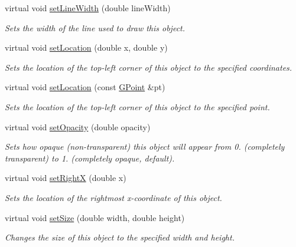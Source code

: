 \begin{DoxyCompactItemize}
virtual void \mbox{\hyperlink{classsgl_1_1GObject_afd6a47c6ea6a1f85ca05a65ba3ff3477}{set\+Line\+Width}} (double line\+Width)
\begin{DoxyCompactList}\small\item\em Sets the width of the line used to draw this object. \end{DoxyCompactList}\item 
virtual void \mbox{\hyperlink{classsgl_1_1GObject_a04594e8ba9b98513a64f1da00dcae18c}{set\+Location}} (double x, double y)
\begin{DoxyCompactList}\small\item\em Sets the location of the top-\/left corner of this object to the specified coordinates. \end{DoxyCompactList}\item 
virtual void \mbox{\hyperlink{classsgl_1_1GObject_aa8480c0b7166cdf8f784cece06ab353f}{set\+Location}} (const \mbox{\hyperlink{structsgl_1_1GPoint}{G\+Point}} \&pt)
\begin{DoxyCompactList}\small\item\em Sets the location of the top-\/left corner of this object to the specified point. \end{DoxyCompactList}\item 
virtual void \mbox{\hyperlink{classsgl_1_1GObject_a04af1866cc1bae4a1226695794a50539}{set\+Opacity}} (double opacity)
\begin{DoxyCompactList}\small\item\em Sets how opaque (non-\/transparent) this object will appear from 0. (completely transparent) to 1. (completely opaque, default). \end{DoxyCompactList}\item 
virtual void \mbox{\hyperlink{classsgl_1_1GObject_a3c90b758cdc2c911c9ef76c4360eb912}{set\+RightX}} (double x)
\begin{DoxyCompactList}\small\item\em Sets the location of the rightmost x-\/coordinate of this object. \end{DoxyCompactList}\item 
virtual void \mbox{\hyperlink{classsgl_1_1GObject_aca25d49481f9bf5fc8f7df4c086c4ce7}{set\+Size}} (double width, double height)
\begin{DoxyCompactList}\small\item\em Changes the size of this object to the specified width and height. \end{DoxyCompactList}\item 

\end{DoxyCompactItemize}
